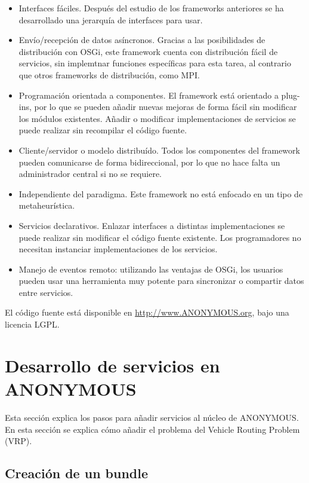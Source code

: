 \documentclass[runningheads]{llncs}
\begin{document}
\begin{itemize}
\item Interfaces fáciles. Después del estudio de los frameworks anteriores se ha desarrollado una jerarquía de interfaces para usar. 
\item Envío/recepción de datos asíncronos. Gracias a las posibilidades de distribución con OSGi, este framework cuenta con distribución fácil de servicios, sin implemtnar funciones específicas para esta tarea, al contrario que otros frameworks de distribución, como MPI.
\item Programación orientada a componentes. El framework está orientado a plug-ins, por lo que se pueden añadir nuevas mejoras de forma fácil sin modificar los módulos existentes. Añadir o modificar implementaciones de servicios se puede realizar sin recompilar el código fuente.
\item Cliente/servidor o modelo distribuído. Todos los componentes del framework pueden comunicarse de forma bidireccional, por lo que no hace falta un administrador central si no se requiere.
\item Independiente del paradigma. Este framework no está enfocado en un tipo de metaheurística.
\item Servicios declarativos. Enlazar interfaces a distintas implementaciones se puede realizar sin modificar el código fuente existente. Los programadores no necesitan instanciar implementaciones de los servicios.
\item Manejo de eventos remoto: utilizando las ventajas de OSGi, los usuarios pueden usar una herramienta muy potente para sincronizar o compartir datos entre servicios.
\end{itemize}

El código fuente está disponible en \url{http://www.ANONYMOUS.org}, bajo una licencia LGPL.

\section{Desarrollo de servicios en ANONYMOUS}
\label{sec:development}

Esta sección explica los pasos para añadir servicios al núcleo de ANONYMOUS. En esta sección se explica cómo añadir el problema del Vehicle Routing Problem (VRP).

\subsection{Creación de un bundle}
\end{document}
